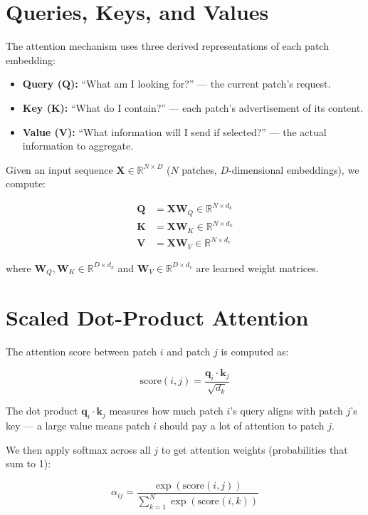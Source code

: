 \documentclass[12pt, a4paper]{report}
\newcommand{\R}{\mathbb{R}}
\newcommand{\mat}[1]{\mathbf{#1}}
\newcommand{\vect}[1]{\bm{#1}}
\begin{document}
\section{Queries, Keys, and Values}

The attention mechanism uses three derived representations of each patch embedding:

\begin{itemize}
    \item \textbf{Query ($\mat{Q}$):} ``What am I looking for?'' — the current patch's request.
    \item \textbf{Key ($\mat{K}$):} ``What do I contain?'' — each patch's advertisement of its content.
    \item \textbf{Value ($\mat{V}$):} ``What information will I send if selected?'' — the actual information to aggregate.
\end{itemize}

Given an input sequence $\mat{X} \in \R^{N \times D}$ ($N$ patches, $D$-dimensional embeddings), we compute:

\begin{align}
\mat{Q} &= \mat{X} \mat{W}_Q \in \R^{N \times d_k} \\
\mat{K} &= \mat{X} \mat{W}_K \in \R^{N \times d_k} \\
\mat{V} &= \mat{X} \mat{W}_V \in \R^{N \times d_v}
\end{align}

where $\mat{W}_Q, \mat{W}_K \in \R^{D \times d_k}$ and $\mat{W}_V \in \R^{D \times d_v}$ are learned weight matrices.

\section{Scaled Dot-Product Attention}

The attention score between patch $i$ and patch $j$ is computed as:

\begin{equation}
\text{score}(i, j) = \frac{\vect{q}_i \cdot \vect{k}_j}{\sqrt{d_k}}
\end{equation}

The dot product $\vect{q}_i \cdot \vect{k}_j$ measures how much patch $i$'s query aligns with patch $j$'s key — a large value means patch $i$ should pay a lot of attention to patch $j$.

We then apply softmax across all $j$ to get attention weights (probabilities that sum to 1):

\begin{equation}
\alpha_{ij} = \frac{\exp(\text{score}(i,j))}{\sum_{k=1}^{N} \exp(\text{score}(i,k))}
\end{equation}
\end{document}
